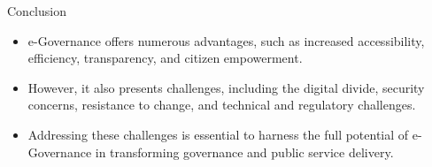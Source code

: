 \begin{frame}{Conclusion}
  \begin{itemize}
    \item e-Governance offers numerous advantages, such as increased accessibility, efficiency, transparency, and citizen empowerment.
    \item However, it also presents challenges, including the digital divide, security concerns, resistance to change, and technical and regulatory challenges.
    \item Addressing these challenges is essential to harness the full potential of e-Governance in transforming governance and public service delivery.
  \end{itemize}
\end{frame}
